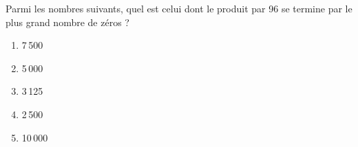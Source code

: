 Parmi les nombres suivants, quel est celui dont le produit par 96 se termine par le plus grand
nombre de zéros ?
\begin{multicols}{5}
  \begin{enumerate}[A/]
  \item 7\,500
  \item 5\,000
  \item 3\,125
  \item 2\,500
  \item 10\,000
  \end{enumerate}
\end{multicols}